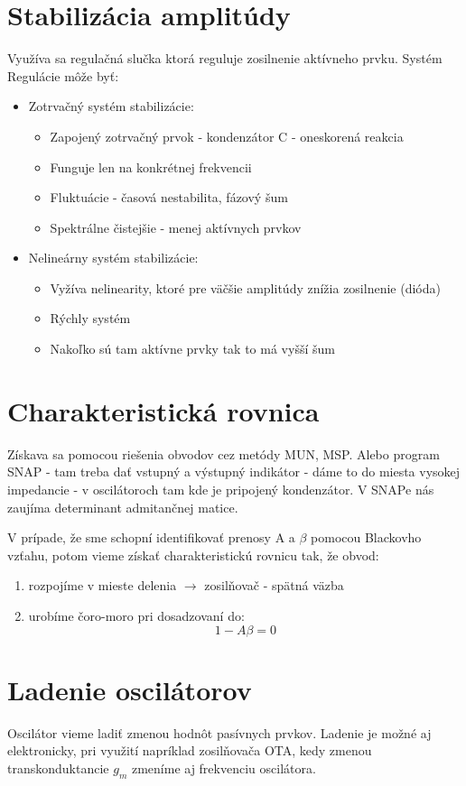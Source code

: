 \section{Stabilizácia amplitúdy}
Využíva sa regulačná slučka ktorá reguluje zosilnenie aktívneho prvku.
Systém Regulácie môže byť:
\begin{itemize}
\item Zotrvačný systém stabilizácie:
\begin{itemize}
	\item Zapojený zotrvačný prvok - kondenzátor C - oneskorená reakcia
	\item Funguje len na konkrétnej frekvencii
	\item Fluktuácie - časová nestabilita, fázový šum
	\item Spektrálne čistejšie - menej aktívnych prvkov
\end{itemize}
\item Nelineárny systém stabilizácie:
\begin{itemize}
	\item Vyžíva nelinearity, ktoré pre väčšie amplitúdy znížia zosilnenie (dióda)
	\item Rýchly systém
	\item Nakoľko sú tam aktívne prvky tak to má vyšší šum
\end{itemize}
\end{itemize}
\section{Charakteristická rovnica}
Získava sa pomocou riešenia obvodov cez metódy MUN, MSP. Alebo program SNAP - tam treba dať vstupný a výstupný indikátor - dáme to do miesta vysokej impedancie - v oscilátoroch tam kde je pripojený kondenzátor. V SNAPe nás zaujíma determinant admitančnej matice.

V prípade, že sme schopní identifikovať prenosy A a $\beta$ pomocou Blackovho vzťahu, potom vieme získať charakteristickú rovnicu tak, že obvod:
\begin{enumerate}
\item rozpojíme v mieste delenia $\rightarrow$ zosilňovač - spätná väzba
\item urobíme čoro-moro pri dosadzovaní do:
\begin{equation}
	1 - A\beta = 0
\end{equation}
\end{enumerate}
\section{Ladenie oscilátorov}
Oscilátor vieme ladiť zmenou hodnôt pasívnych prvkov. Ladenie je možné aj elektronicky, pri využití napríklad zosilňovača OTA, kedy zmenou transkonduktancie $g_m$ zmeníme aj frekvenciu oscilátora.
